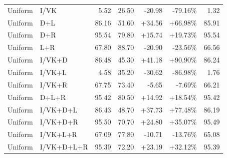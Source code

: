 \documentclass[UTF8,10pt,a4paper]{ctexart}
\newcommand{\better}[1]{\textcolor{ImpBlue}{#1}}
\newcommand{\worse}[1]{\textcolor{DropRed}{#1}}
\begin{document}
{\begin{longtable}{llrrrrr}
Uniform & I/VK & 5.52 & 26.50 & \worse{-20.98} & \worse{-79.16\%} & 1.32\\
Uniform & D+L & 86.16 & 51.60 & \better{+34.56} & \better{+66.98\%} & 85.91\\
Uniform & D+R & 95.54 & 79.80 & \better{+15.74} & \better{+19.73\%} & 95.54\\
Uniform & L+R & 67.80 & 88.70 & \worse{-20.90} & \worse{-23.56\%} & 66.56\\
Uniform & I/VK+D & 86.48 & 45.30 & \better{+41.18} & \better{+90.90\%} & 86.24\\
Uniform & I/VK+L & 4.58 & 35.20 & \worse{-30.62} & \worse{-86.98\%} & 1.76\\
Uniform & I/VK+R & 67.75 & 73.40 & \worse{-5.65} & \worse{-7.69\%} & 66.21\\
Uniform & D+L+R & 95.42 & 80.50 & \better{+14.92} & \better{+18.54\%} & 95.42\\
Uniform & I/VK+D+L & 86.43 & 48.70 & \better{+37.73} & \better{+77.48\%} & 86.19\\
Uniform & I/VK+D+R & 95.50 & 70.70 & \better{+24.80} & \better{+35.07\%} & 95.49\\
Uniform & I/VK+L+R & 67.09 & 77.80 & \worse{-10.71} & \worse{-13.76\%} & 65.08\\
Uniform & I/VK+D+L+R & 95.39 & 72.20 & \better{+23.19} & \better{+32.12\%} & 95.39\\
\bottomrule
\end{longtable}
}
\end{document}
